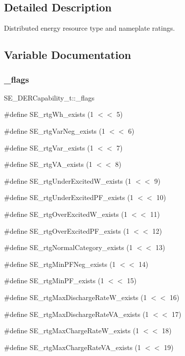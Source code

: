 \subsection{Detailed Description}
Distributed energy resource type and nameplate ratings. 

\subsection{Variable Documentation}
\mbox{\label{group__DERCapability_ga0f194b8e66999993dad21c45fe22d0c7}} 
\subsubsection{\texorpdfstring{\+\_\+flags}{\_flags}}
{\footnotesize\ttfamily S\+E\+\_\+\+D\+E\+R\+Capability\+\_\+t\+::\+\_\+flags}

\#define S\+E\+\_\+rtg\+Wh\+\_\+exists (1 $<$$<$ 5)

\#define S\+E\+\_\+rtg\+Var\+Neg\+\_\+exists (1 $<$$<$ 6)

\#define S\+E\+\_\+rtg\+Var\+\_\+exists (1 $<$$<$ 7)

\#define S\+E\+\_\+rtg\+V\+A\+\_\+exists (1 $<$$<$ 8)

\#define S\+E\+\_\+rtg\+Under\+Excited\+W\+\_\+exists (1 $<$$<$ 9)

\#define S\+E\+\_\+rtg\+Under\+Excited\+P\+F\+\_\+exists (1 $<$$<$ 10)

\#define S\+E\+\_\+rtg\+Over\+Excited\+W\+\_\+exists (1 $<$$<$ 11)

\#define S\+E\+\_\+rtg\+Over\+Excited\+P\+F\+\_\+exists (1 $<$$<$ 12)

\#define S\+E\+\_\+rtg\+Normal\+Category\+\_\+exists (1 $<$$<$ 13)

\#define S\+E\+\_\+rtg\+Min\+P\+F\+Neg\+\_\+exists (1 $<$$<$ 14)

\#define S\+E\+\_\+rtg\+Min\+P\+F\+\_\+exists (1 $<$$<$ 15)

\#define S\+E\+\_\+rtg\+Max\+Discharge\+Rate\+W\+\_\+exists (1 $<$$<$ 16)

\#define S\+E\+\_\+rtg\+Max\+Discharge\+Rate\+V\+A\+\_\+exists (1 $<$$<$ 17)

\#define S\+E\+\_\+rtg\+Max\+Charge\+Rate\+W\+\_\+exists (1 $<$$<$ 18)

\#define S\+E\+\_\+rtg\+Max\+Charge\+Rate\+V\+A\+\_\+exists (1 $<$$<$ 19)

